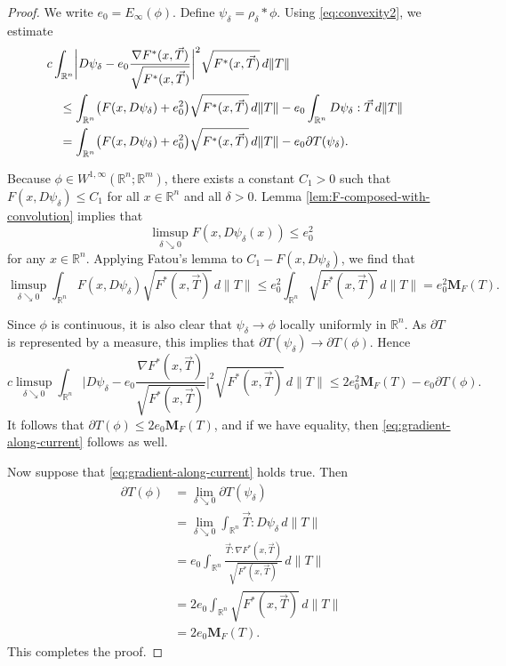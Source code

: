 \documentclass[a4paper]{article}
\newcommand{\R}{\mathbb{R}}
\newcommand{\M}{\mathbf{M}}
\newcommand{\grad}{\nabla}
\theoremstyle{definition}
\theoremstyle{remark}
\begin{document}
\begin{proof}
We write $e_0 = E_\infty(\phi)$.
Define $\psi_\delta = \rho_\delta *\phi$. Using \eqref{eq:convexity2}, we
estimate
\[
\begin{split}
\lefteqn{c\int_{\R^n} \biggl|D\psi_\delta - e_0 \frac{\grad F^*(x, \vec{T})}{\sqrt{F^*(x, \vec{T})}}\biggr|^2 \sqrt{F^*(x, \vec{T})} \, d\|T\|} \quad \\
& \le \int_{\R^n} \bigl(F(x, D\psi_\delta) + e_0^2\bigr) \sqrt{F^*(x, \vec{T})} \, d\|T\| - e_0 \int_{\R^n} D\psi_\delta : \vec{T} \, d\|T\| \\
& = \int_{\R^n} \bigl(F(x, D\psi_\delta) + e_0^2\bigr) \sqrt{F^*(x, \vec{T})} \, d\|T\| - e_0 \partial T(\psi_\delta).
\end{split}
\]

Because $\phi \in W^{1, \infty}(\R^n; \R^m)$, there exists a constant $C_1 > 0$ such that
$F(x, D\psi_\delta) \le C_1$ for all $x \in \R^n$ and all $\delta > 0$.
Lemma \ref{lem:F-composed-with-convolution} implies that
\[
\limsup_{\delta \searrow 0} F(x, D\psi_\delta(x)) \le e_0^2
\]
for any $x \in \R^n$.
Applying Fatou's lemma to $C_1 - F(x, D\psi_\delta)$, we find that
\[
\limsup_{\delta \searrow 0} \int_{\R^n} F(x, D\psi_\delta) \sqrt{F^*(x, \vec{T})} \, d\|T\| \le e_0^2 \int_{\R^n} \sqrt{F^*(x, \vec{T})} \, d\|T\| = e_0^2 \M_F(T).
\]

Since $\phi$ is continuous, it is also clear that $\psi_\delta \to \phi$
locally uniformly in $\R^n$. As $\partial T$ is represented by a measure,
this implies that $\partial T(\psi_\delta) \to \partial T(\phi)$. Hence
\[
c \limsup_{\delta \searrow 0} \int_{\R^n} \biggl|D\psi_\delta - e_0 \frac{\grad F^*(x, \vec{T})}{\sqrt{F^*(x, \vec{T})}}\biggr|^2 \sqrt{F^*(x, \vec{T})} \, d\|T\| \le 2 e_0^2 \M_F(T) - e_0 \partial T(\phi).
\]
It follows that $\partial T(\phi) \le 2e_0 \M_F(T)$, and if we have
equality, then \eqref{eq:gradient-along-current} follows as well.

Now suppose that \eqref{eq:gradient-along-current} holds true.
Then
\[
\begin{split}
\partial T(\phi) & = \lim_{\delta \searrow 0} \partial T(\psi_\delta) \\
& = \lim_{\delta \searrow 0} \int_{\R^n} \vec{T} : D\psi_\delta \, d\|T\| \\
& = e_0 \int_{\R^n} \frac{\vec{T} : \grad F^*(x, \vec{T})}{\sqrt{F^*(x, \vec{T})}} \, d\|T\| \\
& = 2e_0 \int_{\R^n} \sqrt{F^*(x, \vec{T})} \, d\|T\| \\
& = 2e_0 \M_F(T).
\end{split}
\]
This completes the proof.
\end{proof}
\end{document}
